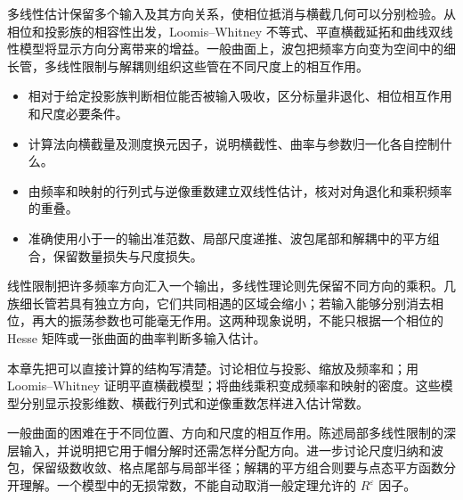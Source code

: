 \begin{chapterabstract}
多线性估计保留多个输入及其方向关系，使相位抵消与横截几何可以分别检验。从相位和投影族的相容性出发，Loomis--Whitney 不等式、平直横截延拓和曲线双线性模型将显示方向分离带来的增益。一般曲面上，波包把频率方向变为空间中的细长管，多线性限制与解耦则组织这些管在不同尺度上的相互作用。
\end{chapterabstract}

\begin{learninggoals}\begin{itemize}
\item\label{b2:item:25-goal-1}相对于给定投影族判断相位能否被输入吸收，区分标量非退化、相位相互作用和尺度必要条件。
\item\label{b2:item:25-goal-2}计算法向横截量及测度换元因子，说明横截性、曲率与参数归一化各自控制什么。
\item\label{b2:item:25-goal-3}由频率和映射的行列式与逆像重数建立双线性估计，核对对角退化和乘积频率的重叠。
\item\label{b2:item:25-goal-4}准确使用小于一的输出准范数、局部尺度递推、波包尾部和解耦中的平方组合，保留数量损失与尺度损失。
\end{itemize}\end{learninggoals}

线性限制把许多频率方向汇入一个输出，多线性理论则先保留不同方向的乘积。几族细长管若具有独立方向，它们共同相遇的区域会缩小；若输入能够分别消去相位，再大的振荡参数也可能毫无作用。这两种现象说明，不能只根据一个相位的 Hesse 矩阵或一张曲面的曲率判断多输入估计。

\ProseParagraphBreak

本章先把可以直接计算的结构写清楚。讨论相位与投影、缩放及频率和；用 Loomis--Whitney 证明平直横截模型；将曲线乘积变成频率和映射的密度。这些模型分别显示投影维数、横截行列式和逆像重数怎样进入估计常数。

\ProseParagraphBreak

一般曲面的困难在于不同位置、方向和尺度的相互作用。陈述局部多线性限制的深层输入，并说明把它用于帽分解时还需怎样分配方向。进一步讨论尺度归纳和波包，保留级数收敛、格点尾部与局部半径；解耦的平方组合则要与点态平方函数分开理解。一个模型中的无损常数，不能自动取消一般定理允许的 \(R^\varepsilon\) 因子。

\ProseParagraphBreak

